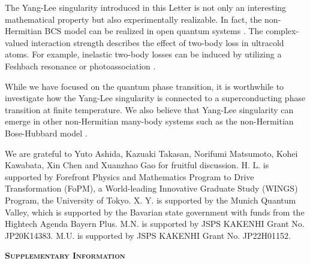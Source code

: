 \documentclass[aps,prl,twocolumn,nofootinbib,superscriptaddress,longbibliography]{revtex4-1}
\begin{document}
	The Yang-Lee singularity introduced in this Letter is not only an interesting mathematical property but also experimentally realizable. In fact, the non-Hermitian BCS model can be realized in open quantum systems \cite{Yamamoto2019,PhysRevA.103.013724}. The complex-valued interaction strength describes the effect of two-body loss in ultracold atoms. For example, inelastic two-body losses can be induced by utilizing a Feshbach resonance \cite{PhysRevLett.115.265301,PhysRevLett.115.265302,Zhang2015} or photoassociation \cite{doi:10.1126/sciadv.1701513,https://doi.org/10.48550/arxiv.2205.13162}. %
	
	While we have focused on the quantum phase transition, it is worthwhile to investigate how the Yang-Lee singularity is connected to a superconducting phase transition at finite temperature. We also believe that Yang-Lee singularity can emerge in other non-Hermitian many-body systems such as the non-Hermitian Bose-Hubbard model \cite{PhysRevA.94.053615}.
	
	We are grateful to Yuto Ashida, Kazuaki Takasan, Norifumi Matsumoto,
	Kohei Kawabata, Xin Chen and Xuanzhao Gao for fruitful discussion.
	H. L. is supported by Forefront Physics and Mathematics Program to
	Drive Transformation (FoPM), a World-leading Innovative Graduate Study
	(WINGS) Program, the University of Tokyo. X. Y. is supported by the Munich Quantum Valley, which is supported by the Bavarian state government with funds from the Hightech Agenda Bayern Plus. M.N. is supported by JSPS
	KAKENHI Grant No. JP20K14383. M.U. is supported by JSPS KAKENHI Grant
	No. JP22H01152. 
	

\clearpage{}

\onecolumngrid
\renewcommand{\thefigure}{S\arabic{figure}}
\setcounter{figure}{0} 
\renewcommand{\thepage}{S\arabic{page}}
\setcounter{page}{1} 
\renewcommand{\theequation}{S.\arabic{equation}}
\setcounter{equation}{0} 
\setcounter{section}{0}

\begin{center}
\textbf{\textsc{\LARGE{}Supplementary Information}}{\LARGE\par}
\par\end{center}

\tableofcontents{}
\end{document}
